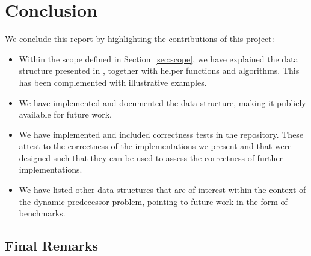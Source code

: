 \chapter{Conclusion} \label{sec:conclusionChapter}

We conclude this report by highlighting the contributions of this project:
\begin{itemize}
    \item
    Within the scope defined in Section~\ref{sec:scope}, we have explained the data structure presented in \cite{patrascu2014dynamic}, together with helper functions and algorithms. This has been complemented with illustrative examples.
    
    \item
    We have implemented and documented the data structure, making it publicly available for future work.
    
    \item
    We have implemented and included correctness tests in the repository. These attest to the correctness of the implementations we present and that were designed such that they can be used to assess the correctness of further implementations.
    
    \item
    We have listed other data structures that are of interest within the context of the dynamic predecessor problem, pointing to future work in the form of benchmarks.
\end{itemize}

\section{Final Remarks}

